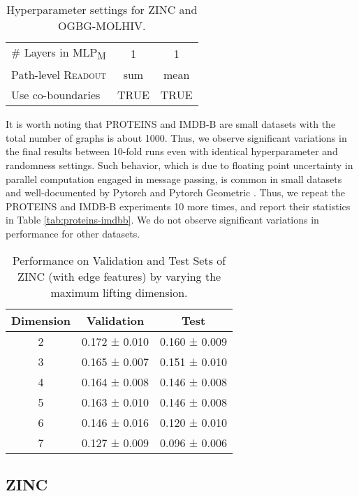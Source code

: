 \documentclass[letterpaper]{article} \usepackage{aaai24}  \usepackage{times}  \usepackage{helvet}  \usepackage{courier}  \usepackage[hyphens]{url}  \usepackage{graphicx} \urlstyle{rm} \def\UrlFont{\rm}  \usepackage{natbib}  \usepackage{caption} \frenchspacing  \setlength{\pdfpagewidth}{8.5in} \setlength{\pdfpageheight}{11in} \usepackage{algorithm}
\begin{document}
\begin{table}[t]
{\begin{tabular}{@{}lcc@{}}
\# Layers in MLP\textsubscript{M} & 1 & 1 \\
Path-level \textsc{Readout}                                                         & sum                      & mean                     \\
Use co-boundaries                                                                   & TRUE                     & TRUE                     \\ \bottomrule
\end{tabular}}
\caption{Hyperparameter settings for ZINC and OGBG-MOLHIV.}
\label{tab:zinc-molhiv-params}
\end{table}

It is worth noting that PROTEINS and IMDB-B are small datasets with the total number of graphs is about 1000. Thus, we observe significant variations in the final results between 10-fold runs even with identical hyperparameter and randomness settings. Such behavior, which is due to floating point uncertainty in parallel computation engaged in message passing, is common in small datasets and well-documented by Pytorch \cite{paszke_pytorch_2019} and Pytorch Geometric \cite{fey_fast_2019}. Thus, we repeat the PROTEINS and IMDB-B experiments 10 more times, and report their statistics in Table \ref{tab:proteins-imdbb}. We do not observe significant variations in performance for other datasets.


\begin{table}[t]
\centering
\begin{tabular}{@{}ccc@{}}
\toprule
Dimension & Validation    & Test          \\ \midrule
2         & 0.172 ± 0.010 & 0.160 ± 0.009 \\
3         & 0.165 ± 0.007 & 0.151 ± 0.010 \\
4         & 0.164 ± 0.008 & 0.146 ± 0.008 \\
5         & 0.163 ± 0.010 & 0.146 ± 0.008 \\
6         & 0.146 ± 0.016 & 0.120 ± 0.010 \\
7         & 0.127 ± 0.009 & 0.096 ± 0.006 \\ \bottomrule
\end{tabular}
\caption{Performance on Validation and Test Sets of ZINC (with edge features) by varying the maximum lifting dimension.}
\label{tab:zinc-vary-dim}
\end{table}


\subsection{ZINC}
\end{document}
